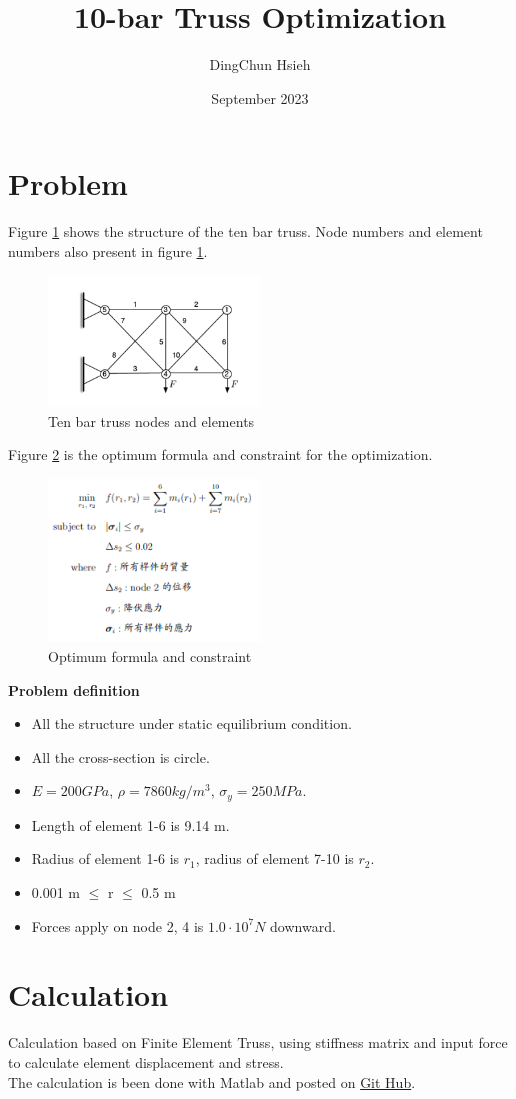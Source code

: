 \documentclass{article}
\title{10-bar Truss Optimization}
\author{DingChun Hsieh}
\date{September 2023}
\begin{document}
\maketitle

\section{Problem}

Figure \ref{fig:Figure 1} shows the structure of the ten bar truss.
Node numbers and element numbers also present in figure \ref{fig:Figure 1}.
\begin{figure}[h]
    \centering
    \includegraphics[width=0.5\textwidth]{../images/ten bar.png}
    \caption{Ten bar truss nodes and elements}
    \label{fig:Figure 1}
\end{figure}

Figure \ref{fig:Figure 2} is the optimum formula and constraint for the optimization.   
\begin{figure}[h]
    \centering
    \includegraphics[width=0.5\textwidth]{../images/constraint.png}
    \caption{Optimum formula and constraint}
    \label{fig:Figure 2}
\end{figure}
\clearpage
\textbf{Problem definition}
\begin{itemize}
	\item All the structure under static equilibrium condition.
	\item All the cross-section is circle.
	\item $E = 200 GPa $, $\rho = 7860 kg/ m^3  $, $ \sigma_y = 250 MPa $.
	\item Length of element 1-6 is 9.14 m.
	\item Radius of element 1-6 is $r_1  $, radius of element 7-10 is $r_2$.
	\item 0.001 m $\le$ r $\le$ 0.5 m
	\item Forces apply on node 2, 4 is $ 1.0 \cdot 10^7 N $ downward.
\end{itemize}
\section{Calculation}
Calculation based on Finite Element Truss, using stiffness matrix and input force to calculate element displacement and stress. \\
The calculation is been done with Matlab and posted on \href{https://github.com/dchsieh/Ten-bar-truss-optimization.git}{Git Hub}.
\end{document}
